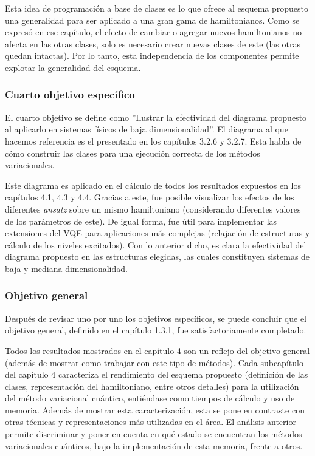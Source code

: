 Esta idea de programación a base de clases es lo que ofrece al esquema propuesto una generalidad para ser aplicado a una gran gama de hamiltonianos. Como se expresó en ese capítulo, el efecto de cambiar o agregar nuevos hamiltonianos no afecta en las otras clases, solo es necesario crear nuevas clases de este (las otras quedan intactas). Por lo tanto, esta independencia de los componentes permite explotar la generalidad del esquema.

\subsubsection{Cuarto objetivo específico}
El cuarto objetivo se define como ''Ilustrar la efectividad del diagrama propuesto al aplicarlo en sistemas físicos de baja dimensionalidad''. El diagrama al que hacemos referencia es el presentado en los capítulos 3.2.6 y 3.2.7. Esta habla de cómo construir las clases para una ejecución correcta de los métodos variacionales.

Este diagrama es aplicado en el cálculo de todos los resultados expuestos en los capítulos 4.1, 4.3 y 4.4. Gracias a este, fue posible visualizar los efectos de los diferentes \textit{ansatz} sobre un mismo hamiltoniano (considerando diferentes valores de los parámetros de este). De igual forma, fue útil para implementar las extensiones del VQE para aplicaciones más complejas (relajación de estructuras y cálculo de los niveles excitados). Con lo anterior dicho, es clara la efectividad del diagrama propuesto en las estructuras elegidas, las cuales constituyen sistemas de baja y mediana dimensionalidad.

\subsubsection{Objetivo general}
Después de revisar uno por uno los objetivos específicos, se puede concluir que el objetivo general, definido en el capítulo 1.3.1, fue satisfactoriamente completado.

Todos los resultados mostrados en el capítulo 4 son un reflejo del objetivo general (además de mostrar como trabajar con este tipo de métodos). Cada subcapítulo del capítulo 4 caracteriza el rendimiento del esquema propuesto (definición de las clases, representación del hamiltoniano, entre otros detalles) para la utilización del método variacional cuántico, entiéndase como tiempos de cálculo y uso de memoria. Además de mostrar esta caracterización, esta se pone en contraste con otras técnicas y representaciones más utilizadas en el área. El análisis anterior permite discriminar y poner en cuenta en qué estado se encuentran los métodos variacionales cuánticos, bajo la implementación de esta memoria, frente a otros.



